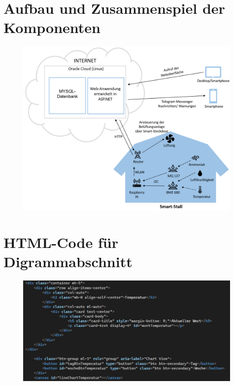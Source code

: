 \documentclass[conference]{IEEEtran}
\begin{document}
\clearpage
\begin{appendices}
	\section{Aufbau und Zusammenspiel der Komponenten}
	\label{sec:AufbauAnhang}
	\begin{figure}[h]
		\centering
		\includegraphics[width=0.99\textwidth]{fig/Projektaufbau.png}
	\end{figure}
	
\clearpage
\section{HTML-Code für Digrammabschnitt}
\label{sec:htmlCodeDiagrammAnhang}
\begin{figure}[h]
    \centering
    \includegraphics[width=0.99\textwidth]{fig/htmlcode.JPG}
\end{figure}


\end{appendices}
\end{document}
